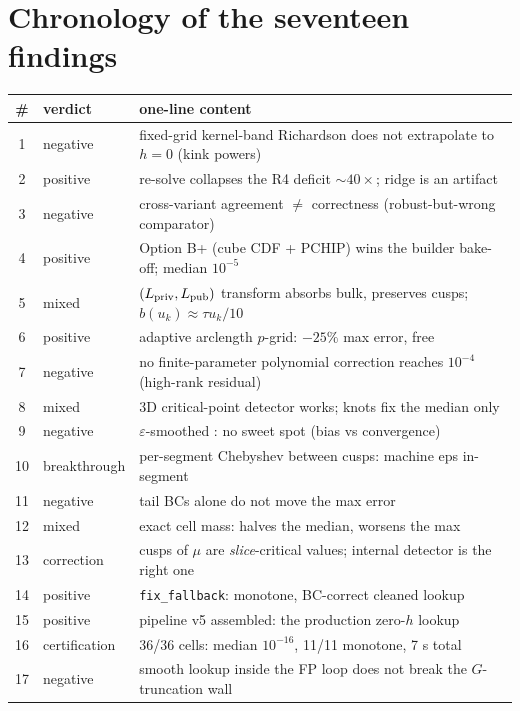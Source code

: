 \chapter{Chronology of the seventeen findings}
\begin{center}\small\begin{tabularx}{\linewidth}{clX}\toprule
\# & verdict & one-line content \\
\midrule
1 & negative & fixed-grid kernel-band Richardson does not extrapolate to $h = 0$ (kink powers) \\
2 & positive & \strict{} re-solve collapses the R4 deficit $\sim 40\times$; ridge is an artifact \\
3 & negative & cross-variant agreement $\ne$ correctness (robust-but-wrong comparator) \\
4 & positive & Option B+ (cube CDF + PCHIP) wins the builder bake-off; median $10^{-5}$ \\
5 & mixed & $(L_{\rm priv}, L_{\rm pub})$ transform absorbs bulk, preserves cusps; $b(u_k) \approx \tau u_k / 10$ \\
6 & positive & adaptive arclength $p$-grid: $-25\%$ max error, free \\
7 & negative & no finite-parameter polynomial correction reaches $10^{-4}$ (high-rank residual) \\
8 & mixed & 3D critical-point detector works; knots fix the median only \\
9 & negative & $\varepsilon$-smoothed \strict{}: no sweet spot (bias vs convergence) \\
10 & breakthrough & per-segment Chebyshev between cusps: machine eps in-segment \\
11 & negative & tail BCs alone do not move the max error \\
12 & mixed & exact cell mass: halves the median, worsens the max \\
13 & correction & cusps of $\mu$ are \emph{slice}-critical values; internal detector is the right one \\
14 & positive & \texttt{fix\_fallback}: monotone, BC-correct cleaned lookup \\
15 & positive & pipeline v5 assembled: the production zero-$h$ lookup \\
16 & certification & 36/36 cells: median $10^{-16}$, 11/11 monotone, 7 s total \\
17 & negative & smooth lookup inside the FP loop does not break the $G$-truncation wall \\
\bottomrule\end{tabularx}\end{center}
